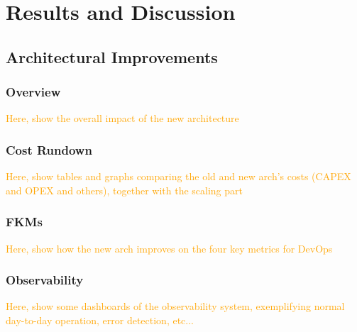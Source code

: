 \chapter{Results and Discussion}\label{results-and-discussion}


\section{Architectural Improvements}\label{results-and-discussion:s:architectural-improvements}

\subsection{Overview}\label{results-and-discussion:ss:overview}

\textcolor{orange}{Here, show the overall impact of the new architecture}

\subsection{Cost Rundown}\label{results-and-discussion:ss:cost-rundown}

\textcolor{orange}{Here, show tables and graphs comparing the old and new arch's costs (CAPEX and OPEX and others), together with the scaling part}

\subsection{FKMs}\label{results-and-discussion:ss:fkms}

\textcolor{orange}{Here, show how the new arch improves on the four key metrics for DevOps}

\subsection{Observability}\label{results-and-discussion:ss:observability}

\textcolor{orange}{Here, show some dashboards of the observability system, exemplifying normal day-to-day operation, error detection, etc...}

